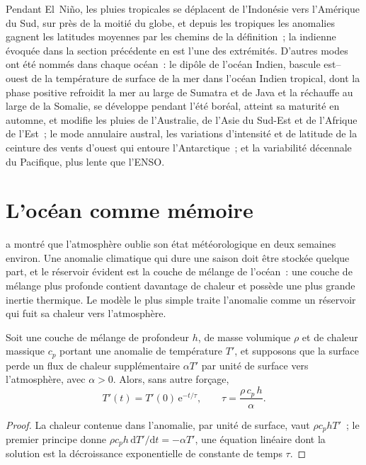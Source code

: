 Pendant El~Niño, les pluies tropicales se déplacent de l'Indonésie vers l'Amérique du Sud, sur près de la moitié du globe,
et depuis les tropiques les anomalies gagnent les latitudes moyennes par les chemins de la définition~; la  indienne
évoquée dans la section précédente en est l'une des extrémités. D'autres modes ont été nommés dans chaque océan~: le dipôle
de l'océan Indien, bascule est--ouest de la température de surface de la mer dans l'océan Indien tropical, dont la phase positive
refroidit la mer au large de Sumatra et de Java et la réchauffe au large de la Somalie, se développe pendant l'été boréal,
atteint sa maturité en automne, et modifie les pluies de l'Australie, de l'Asie du Sud-Est et de l'Afrique de l'Est~;
le mode annulaire austral, les variations d'intensité et de latitude de la ceinture des vents d'ouest
qui entoure l'Antarctique~;
et la variabilité décennale du Pacifique, plus lente que l'ENSO.

\section{L'océan comme mémoire}\label{sec:b2:climate-variability:memory}

 a montré que l'atmosphère oublie son état météorologique en deux semaines environ.
Une anomalie climatique qui dure une saison doit être stockée quelque part, et le réservoir évident est la couche de
mélange de l'océan~: une couche de mélange plus profonde contient davantage de chaleur et possède une plus grande inertie
thermique. Le modèle le plus simple traite l'anomalie comme un réservoir qui fuit sa chaleur vers l'atmosphère.

\begin{proposition}\label{prop:b2:climate-variability:damping}
Soit une couche de mélange de profondeur $h$, de masse volumique $\rho$ et de chaleur massique $c_p$ portant une anomalie de température
$T'$, et supposons que la surface perde un flux de chaleur supplémentaire $\alpha T'$ par unité de surface vers l'atmosphère,
avec $\alpha > 0$. Alors, sans autre forçage,
\[
  T'(t) = T'(0)\,\mathrm{e}^{-t/\tau}, \qquad \tau = \frac{\rho\,c_p\,h}{\alpha} .
\]
\end{proposition}

\begin{proof}
La chaleur contenue dans l'anomalie, par unité de surface, vaut $\rho c_p h T'$~; le premier principe donne $\rho c_p h
\,\mathrm{d}T'/\mathrm{d}t = -\alpha T'$, une équation linéaire dont la solution est la décroissance exponentielle
de constante de temps $\tau$.
\end{proof}


